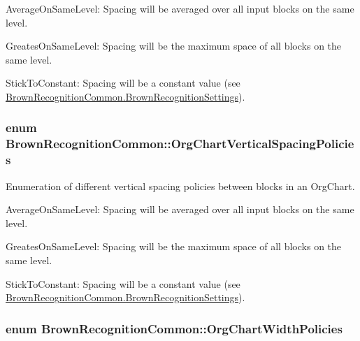 \begin{DoxyItemize}
\item \-Average\-On\-Same\-Level\-: \-Spacing will be averaged over all input blocks on the same level.
\item \-Greates\-On\-Same\-Level\-: \-Spacing will be the maximum space of all blocks on the same level.
\item \-Stick\-To\-Constant\-: \-Spacing will be a constant value (see \hyperlink{class_brown_recognition_common_1_1_brown_recognition_settings}{\-Brown\-Recognition\-Common.\-Brown\-Recognition\-Settings}). 
\end{DoxyItemize}\hypertarget{namespace_brown_recognition_common_a1396f230cbda4b33de9ba5d56c9790c7}{
\subsubsection[{\-Org\-Chart\-Vertical\-Spacing\-Policies}]{\setlength{\rightskip}{0pt plus 5cm}enum {\bf \-Brown\-Recognition\-Common\-::\-Org\-Chart\-Vertical\-Spacing\-Policies}}}
\label{namespace_brown_recognition_common_a1396f230cbda4b33de9ba5d56c9790c7}


\-Enumeration of different vertical spacing policies between blocks in an \-Org\-Chart. 


\begin{DoxyItemize}
\item \-Average\-On\-Same\-Level\-: \-Spacing will be averaged over all input blocks on the same level.
\item \-Greates\-On\-Same\-Level\-: \-Spacing will be the maximum space of all blocks on the same level.
\item \-Stick\-To\-Constant\-: \-Spacing will be a constant value (see \hyperlink{class_brown_recognition_common_1_1_brown_recognition_settings}{\-Brown\-Recognition\-Common.\-Brown\-Recognition\-Settings}). 
\end{DoxyItemize}\hypertarget{namespace_brown_recognition_common_a8e1f3265a68d8df8c7cc278d6c116a7d}{
\subsubsection[{\-Org\-Chart\-Width\-Policies}]{\setlength{\rightskip}{0pt plus 5cm}enum {\bf \-Brown\-Recognition\-Common\-::\-Org\-Chart\-Width\-Policies}}}
\label{namespace_brown_recognition_common_a8e1f3265a68d8df8c7cc278d6c116a7d}


